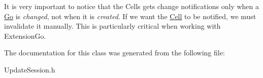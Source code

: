 It is very important to notice that the Cells gets change notifications only when a \hyperlink{classHurricane_1_1Go}{Go} is {\itshape changed}, not when it is {\itshape created}. If we want the \hyperlink{classHurricane_1_1Cell}{Cell} to be notified, we must invalidate it manually. This is particularly critical when working with Extension\-Go. 

The documentation for this class was generated from the following file\-:\begin{DoxyCompactItemize}
\item 
Update\-Session.\-h\end{DoxyCompactItemize}
